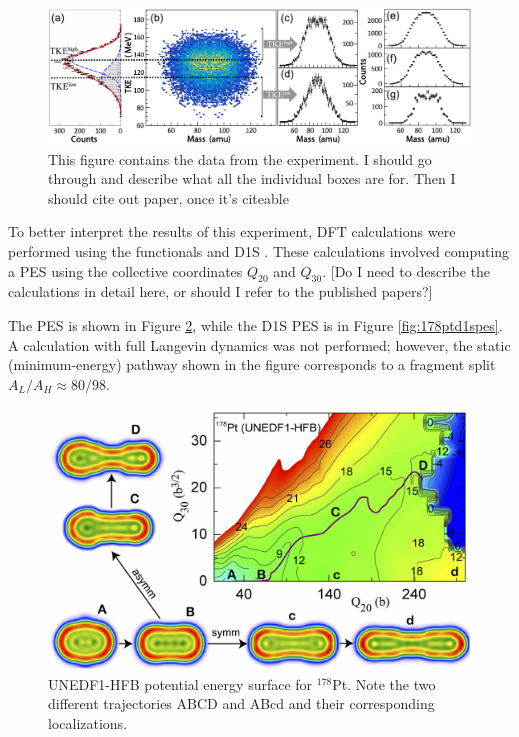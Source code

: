 \begin{figure}
	\includegraphics[width=0.95\linewidth]{TeX_files/178Pt_expt_data}
	\caption[$^{178}$Pt experimental data]{This figure contains the data from the {\Pt} experiment. I should go through and describe what all the individual boxes are for. Then I should cite out paper, once it's citeable}
	\label{fig:178ptexptdata}
\end{figure}

To better interpret the results of this experiment, DFT calculations were performed using the functionals {\hfb} \cite{Schunck2015} and D1S \cite{Berger1989}. These calculations involved computing a PES using the collective coordinates $Q_{20}$ and $Q_{30}$. [Do I need to describe the calculations in detail here, or should I refer to the published papers?]

The {\hfb} PES is shown in Figure \ref{fig:178ptunedf1pes}, while the D1S PES is in Figure \ref{fig:178ptd1spes}. A calculation with full Langevin dynamics was not performed; however, the static (minimum-energy) pathway shown in the figure corresponds to a fragment split $A_L/A_H \approx 80/98$.

\begin{figure}
	\centering
	\includegraphics[width=0.7\linewidth]{TeX_files/178Pt_unedf1_pes}
	\caption[UNEDF1-HFB potential energy surface for $^{178}$Pt]{UNEDF1-HFB potential energy surface for $^{178}$Pt. Note the two different trajectories ABCD and ABcd and their corresponding localizations.}
	\label{fig:178ptunedf1pes}
\end{figure}

